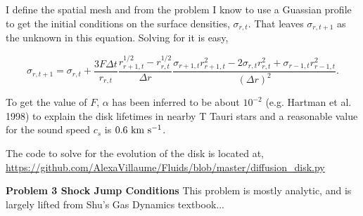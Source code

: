 \documentclass[12pt]{article}
\begin{document}
\begin{itemize}
I define the spatial mesh and from the problem I know to use a Guassian profile to get the initial conditions on the surface densities, $\sigma_{r,t}$. That leaves $\sigma_{r,t+1}$ as the unknown in this equation. Solving for it is easy,

\begin{equation}
\sigma_{r, t+1}  = \sigma_{r,t} + \frac{3F\Delta t}{r_{r,t}}\frac{r^{1/2}_{r+1,t} - r^{1/2}_{r,t}}{\Delta r}\frac{\sigma_{r+1,t}r^2_{r+1,t} - 2\sigma_{r,t}r^2_{r,t} + \sigma_{r-1,t}r^2_{r-1,t}}{\left(\Delta r \right)^2}.
\end{equation}

To get the value of $F$, $\alpha$ has been inferred to be about $10^{-2}$ (e.g. Hartman et al. 1998) to explain the disk lifetimes in nearby T Tauri stars and a reasonable value for the sound speed $c_s$ is $0.6 {\rm ~km ~s^{-1}}$.

The code to solve for the evolution of the disk is located at, \url{https://github.com/AlexaVillaume/Fluids/blob/master/diffusion_disk.py}


\end{itemize}








\noindent \textbf{Problem 3 Shock Jump Conditions} This problem is mostly analytic, and is largely lifted from Shu's Gas Dynamics textbook...
\end{document}
